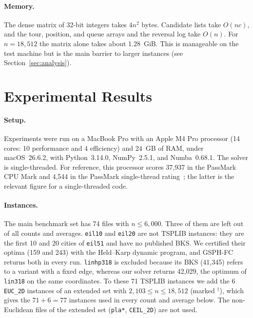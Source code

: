 \documentclass[runningheads]{llncs}
\begin{document}
\paragraph{Memory.} The dense matrix of 32-bit integers takes $4n^2$
bytes. Candidate lists take $O(nc)$, and the tour, position, and
queue arrays and the reversal log take $O(n)$. For $n=18{,}512$ the
matrix alone takes about 1.28~GiB. This is manageable on the test
machine but is the main barrier to larger instances (see
Section~\ref{sec:analysis}).

\section{Experimental Results}
\label{sec:experiments}

\paragraph{Setup.}
Experiments were run on a MacBook Pro with an Apple M4 Pro processor
(14 cores: 10 performance and 4 efficiency) and 24~GB of RAM, under
macOS~26.6.2, with Python~3.14.0, NumPy~2.5.1, and Numba~0.68.1. The
solver is single-threaded. For reference, this processor scores
37{,}937 in the PassMark CPU Mark and 4{,}544 in the PassMark
single-thread rating~\cite{passmark_m4pro}; the latter is the relevant
figure for a single-threaded code.

\paragraph{Instances.} The main benchmark set has 74 files with
$n\le 6{,}000$. Three of them are left out of all counts and averages.
\texttt{eil10} and \texttt{eil20} are not TSPLIB instances: they are the
first 10 and 20 cities of \texttt{eil51} and have no published BKS. We
certified their optima (159 and 243) with the Held--Karp dynamic
program, and GSPH-FC returns both in every run. \texttt{linhp318} is
excluded because its BKS (41{,}345) refers to a variant with a fixed
edge, whereas our solver returns 42{,}029, the optimum of
\texttt{lin318} on the same coordinates. To these 71 TSPLIB instances we
add the 6 \texttt{EUC\_2D} instances of an extended set with
$2{,}103\le n\le 18{,}512$ (marked $^{\dagger}$), which gives the
$71+6=77$ instances used in every count and average below. The
non-Euclidean files of the extended set (\texttt{pla*}, \texttt{CEIL\_2D})
are not used.
\end{document}
